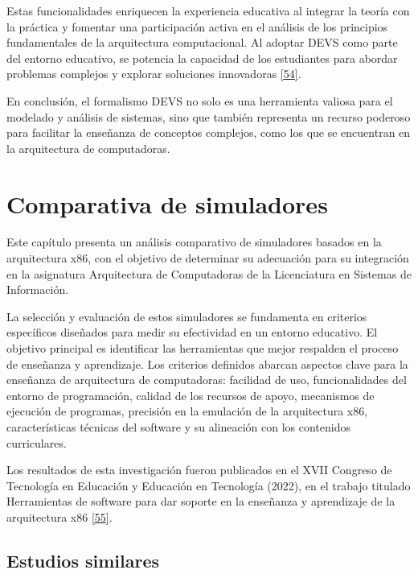 \documentclass[12pt,oneside]{templates/unerthesis}
\begin{document}
Estas funcionalidades enriquecen la experiencia educativa al integrar la teoría con la práctica y fomentar una participación activa en el análisis de los principios fundamentales de la arquitectura computacional. Al adoptar DEVS como parte del entorno educativo, se potencia la capacidad de los estudiantes para abordar problemas complejos y explorar soluciones innovadoras \protect\hyperlink{ref-calvo_valdes_simulador_2010}{{[}54{]}}.

En conclusión, el formalismo DEVS no solo es una herramienta valiosa para el modelado y análisis de sistemas, sino que también representa un recurso poderoso para facilitar la enseñanza de conceptos complejos, como los que se encuentran en la arquitectura de computadoras.

\hypertarget{comparativa}{%
\chapter{Comparativa de simuladores}\label{comparativa}}

Este capítulo presenta un análisis comparativo de simuladores basados en la arquitectura x86, con el objetivo de determinar su adecuación para su integración en la asignatura Arquitectura de Computadoras de la Licenciatura en Sistemas de Información.

La selección y evaluación de estos simuladores se fundamenta en criterios específicos diseñados para medir su efectividad en un entorno educativo. El objetivo principal es identificar las herramientas que mejor respalden el proceso de enseñanza y aprendizaje. Los criterios definidos abarcan aspectos clave para la enseñanza de arquitectura de computadoras: facilidad de uso, funcionalidades del entorno de programación, calidad de los recursos de apoyo, mecanismos de ejecución de programas, precisión en la emulación de la arquitectura x86, características técnicas del software y su alineación con los contenidos curriculares.

Los resultados de esta investigación fueron publicados en el XVII Congreso de Tecnología en Educación y Educación en Tecnología (2022), en el trabajo titulado Herramientas de software para dar soporte en la enseñanza y aprendizaje de la arquitectura x86 \protect\hyperlink{ref-colombani_herramientas_2022}{{[}55{]}}.

\hypertarget{estudios-similares}{%
\section{Estudios similares}\label{estudios-similares}}
\end{document}
